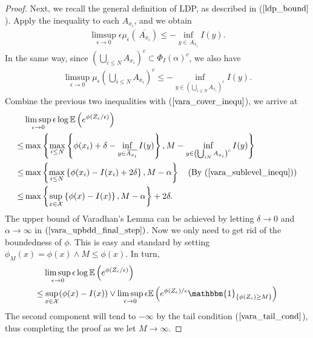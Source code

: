 \documentclass[10pt]{article}
\def\X{{\cal X}}
\newcommand{\e}{\mathbb{E}}
\newcommand{\olsi}[1]{\,\overline{\!{#1}}}
\newenvironment{Proof of lemma}{\noindent{\bf Proof of Lemma}}{\hfill$\Box$\newline}
\newenvironment{Proof of claim}{\noindent{\bf Proof of claim}}{\hfill$\Box$\newline}
\newenvironment{Proof of theorem}{\noindent{\bf Proof of Theorem}}{\hfill\scriptsize{$\Box$}\newline}
\newenvironment{Proof of theorems}{\noindent{\bf Proof of Theorems}}{\hfill$\Box$\newline}
\newenvironment{Proof of proposition}{\noindent{\bf Proof of Proposition}}{\hfill$\Box$\newline}
\newenvironment{Proof of propositions}{\noindent{\bf Proof of Propositions}}{\hfill$\Box$\newline}
\newenvironment{Proof of exercise}{\noindent{\it Proof of Exercise:}}{\hfill$\Box$}
\numberwithin{equation}{section}
\begin{document}
\begin{proof}
    Next, we recall the general definition of LDP, as described in ($\ref{ldp_bound}$). Apply the inequality to each $A_{x_i}$, and we obtain
    \begin{align}
        \limsup_{\epsilon \to 0} \epsilon \mu_{\epsilon}\left(\olsi{A_{x_i}}\right) \leq -\inf_{y \in \olsi{A_{x_i}}} I(y).
    \end{align}
    In the same way, since $\left(\bigcup_{i \leq N} A_{x_i}\right)^c \subset \Phi_I(\alpha)^c$, we also have
    \begin{align}
        \limsup_{\epsilon \to 0} \mu_{\epsilon}\left(\bigcup_{i \leq N} A_{x_i}\right)^c \leq -\inf_{y \in \left(\bigcup_{i \leq N} A_{x_i}\right)^c} I(y).
    \end{align}
    Combine the previous two inequalities with ($\ref{vara_cover_inequ}$), we arrive at
    \begin{align} \label{vara_upbdd_final_step}
        &\limsup_{\epsilon \to 0} \epsilon \log \e\left(e^{\phi(Z_{\epsilon}/\epsilon)}\right) \nonumber \\
        \leq& \max \left\{\max_{i \leq N} \left\{\phi(x_i)+\delta - \inf_{y \in \olsi{A_{x_i}}} I(y)\right\}, M - \inf_{y \in \left(\bigcup_{i  N} A_{x_i}\right)^c} I(y) \right\}  \nonumber \\
        \leq& \max \left\{\max_{i \leq N} \left\{\phi(x_i)- I(x_i) + 2\delta \right\}, M - \alpha \right\}  \quad (\text{By ($\ref{vara_sublevel_inequ}$)})\nonumber \\
        \leq& \max \left\{\sup_{x \in \X} \left\{\phi(x)- I(x) \right\}, M - \alpha \right\} + 2\delta.
    \end{align}
    The upper bound of Varadhan's Lemma can be achieved by letting $\delta \to 0$ and $\alpha \to \infty$ in $(\ref{vara_upbdd_final_step})$.
    Now we only need to get rid of the boundedness of $\phi$. This is easy and standard by setting $\phi_M(x) = \phi(x) \wedge M \leq \phi(x).$ In turn,
    \begin{align}
        &\limsup_{\epsilon \to 0} \epsilon \log \e\left(e^{\phi(Z_{\epsilon}/\epsilon)}\right) 
        \nonumber \\
        \leq& \sup_{x \in \X}(\phi(x)-I(x))\vee \limsup_{\epsilon \to 0} \epsilon\e \left(e^{\phi(Z_{\epsilon})/\epsilon}\mathbbm{1}_{\{\phi(Z_{\epsilon}) \geq M\}}\right)
    \end{align}
    The second component will tend to $-\infty$ by the tail condition ($\ref{vara_tail_cond}$), thus completing the proof as we let $M \to \infty$.
\end{proof}
\end{document}
